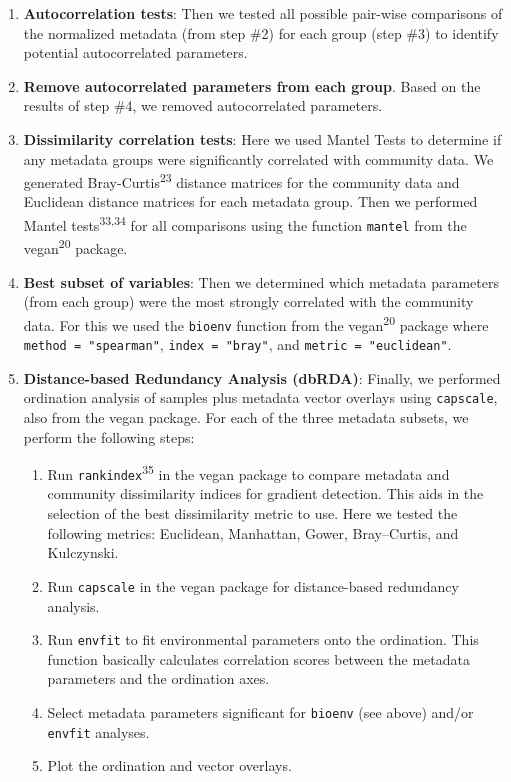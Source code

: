 \documentclass[
  10pt,
  letterpaper,
  DIV=11,
  numbers=noendperiod]{scrartcl}
\providecommand{\tightlist}{%
  \setlength{\itemsep}{0pt}\setlength{\parskip}{0pt}}\usepackage{longtable,booktabs,array}
\begin{document}
\begin{enumerate}
\def\labelenumi{\arabic{enumi})}
\setcounter{enumi}{3}
\item
  \textbf{Autocorrelation tests}: Then we tested all possible pair-wise
  comparisons of the normalized metadata (from step \#2) for each group
  (step \#3) to identify potential autocorrelated parameters.
\item
  \textbf{Remove autocorrelated parameters from each group}. Based on
  the results of step \#4, we removed autocorrelated parameters.
\item
  \textbf{Dissimilarity correlation tests}: Here we used Mantel Tests to
  determine if any metadata groups were significantly correlated with
  community data. We generated Bray-Curtis\textsuperscript{23} distance
  matrices for the community data and Euclidean distance matrices for
  each metadata group. Then we performed Mantel
  tests\textsuperscript{33,34} for all comparisons using the function
  \texttt{mantel} from the vegan\textsuperscript{20} package.
\item
  \textbf{Best subset of variables}: Then we determined which metadata
  parameters (from each group) were the most strongly correlated with
  the community data. For this we used the \texttt{bioenv} function from
  the vegan\textsuperscript{20} package where
  \texttt{method\ =\ "spearman"}, \texttt{index\ =\ "bray"}, and
  \texttt{metric\ =\ "euclidean"}.
\item
  \textbf{Distance-based Redundancy Analysis (dbRDA)}: Finally, we
  performed ordination analysis of samples plus metadata vector overlays
  using \texttt{capscale}, also from the vegan package. For each of the
  three metadata subsets, we perform the following steps:

  \begin{enumerate}
  \def\labelenumii{\roman{enumii})}
  \tightlist
  \item
    Run \texttt{rankindex}\textsuperscript{35} in the vegan package to
    compare metadata and community dissimilarity indices for gradient
    detection. This aids in the selection of the best dissimilarity
    metric to use. Here we tested the following metrics: Euclidean,
    Manhattan, Gower, Bray--Curtis, and Kulczynski.
  \item
    Run \texttt{capscale} in the vegan package for distance-based
    redundancy analysis.
  \item
    Run \texttt{envfit} to fit environmental parameters onto the
    ordination. This function basically calculates correlation scores
    between the metadata parameters and the ordination axes.
  \item
    Select metadata parameters significant for \texttt{bioenv} (see
    above) and/or \texttt{envfit} analyses.
  \item
    Plot the ordination and vector overlays.
  \end{enumerate}
\end{enumerate}
\end{document}
